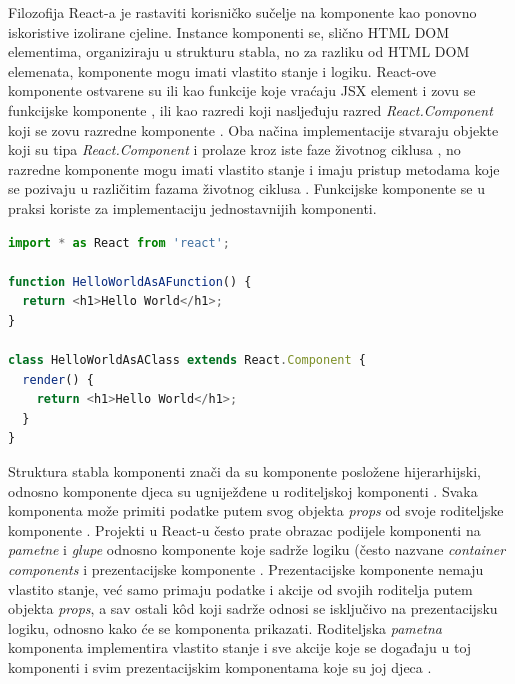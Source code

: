 \documentclass[times, utf8, diplomski, numeric]{fer}
\newcommand{\razmakp}{\vspace{18pt}}
\newcommand{\razmaks}{\vspace{10pt}}
\begin{document}
Filozofija React-a je rastaviti korisničko sučelje na komponente kao ponovno iskoristive izolirane cjeline.
Instance komponenti se, slično HTML DOM elementima, organiziraju u strukturu stabla, no za razliku od HTML DOM elemenata, komponente mogu imati vlastito stanje i logiku. React-ove komponente ostvarene su ili kao funkcije koje vraćaju JSX element i zovu se funkcijske komponente , ili kao razredi koji nasljeđuju razred \emph{React.Component} koji se zovu razredne komponente .
Oba načina implementacije stvaraju objekte koji su tipa \emph{React.Component} i prolaze kroz iste faze životnog ciklusa , no razredne komponente mogu imati vlastito stanje i imaju pristup metodama koje se pozivaju u različitim fazama životnog ciklusa  \citep{react_docs}.
Funkcijske komponente se u praksi koriste za implementaciju jednostavnijih komponenti.

\razmakp %
\begin{lstlisting}[language=JavaScript, caption={Primjer funkcijske i razredne komponente}, label={lst:component}]
import * as React from 'react';

function HelloWorldAsAFunction() {
  return <h1>Hello World</h1>;
}

class HelloWorldAsAClass extends React.Component {
  render() {
    return <h1>Hello World</h1>;
  }
}
\end{lstlisting}
\razmaks

Struktura stabla komponenti znači da su komponente posložene hijerarhijski, odnosno komponente djeca  su ugniježđene u roditeljskoj komponenti .
Svaka komponenta može primiti podatke putem svog objekta \emph{props} od svoje roditeljske komponente \citep{react_docs}.
Projekti u React-u često prate obrazac podijele komponenti na \emph{pametne} i \emph{glupe} odnosno komponente koje sadrže logiku (često nazvane \emph{container components} i prezentacijske komponente .
Prezentacijske komponente nemaju vlastito stanje, već samo primaju podatke i akcije od svojih roditelja putem objekta \emph{props}, a sav ostali kôd koji sadrže odnosi se isključivo na prezentacijsku logiku, odnosno kako će se komponenta prikazati.
Roditeljska \emph{pametna} komponenta implementira vlastito stanje i sve akcije koje se događaju u toj komponenti i svim prezentacijskim komponentama koje su joj djeca \citep{med_comp}.
\end{document}
